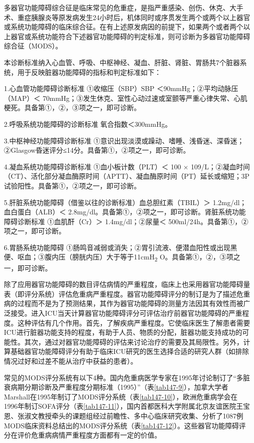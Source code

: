 多器官功能障碍综合征是临床常见的危重症，是指严重感染、创伤、休克、大手术、重症胰腺炎等原发病发生24小时后，机体同时或序贯发生两个或两个以上器官或系统功能障碍的临床综合征。在有上述原发病因的前提下，如果两个或者两个以上器官或系统功能符合下述器官功能障碍的判定标准，则可诊断为多器官功能障碍综合征（MODS）。

本诊断标准纳入心血管、呼吸、中枢神经、凝血、肝脏、肾脏、胃肠共7个脏器系统，用于反映脏器功能障碍的指标和判定标准如下：

1.心血管功能障碍诊断标准 ①收缩压（SBP）SBP
＜90mmHg；②平均动脉压（MAP）＜
70mmHg；③发生休克、室性心动过速或室颤等严重心律失常、心肌梗死。具备第①，②，③项之一，即可诊断。

2.呼吸系统功能障碍的诊断标准 氧合指数＜300mmHg。

3.中枢神经功能障碍诊断标准
①意识出现淡漠或躁动、嗜睡、浅昏迷、深昏迷；②Glasgow昏迷评分≤14分。具备第①，②项之一，即可诊断。

4.凝血系统功能障碍诊断标准 ①血小板计数（PLT）＜ 100 ×
109/L；②凝血时间（CT）、活化部分凝血酶原时间（APTT）、凝血酶原时间（PT）延长或缩短；3P试验阳性。具备第①，②项之一，即可诊断。

5.肝脏系统功能障碍（借鉴以往的诊断标准）血总胆红素（TBIL）＞
1.2mg/dl；血白蛋白（ALB）＜
2.8mg/dl。具备第①，②项之一，即可诊断。肾脏系统功能障碍诊断标准
①血肌酐（Cr）＞ 1.4mg/dl；②尿量＜
500ml/24h。具备第①，②项之一，即可诊断。

6.胃肠系统功能障碍
①肠鸣音减弱或消失；②胃引流液、便潜血阳性或出现黑便、呕血；③腹内压（膀胱内压）大于等于11cmH\textsubscript{2}
O。具备第①，②，③项之一，即可诊断。

除了应用器官功能障碍的数目评估病情的严重程度，临床上也采用器官功能障碍量表（即评分系统）评估危重病严重程度。器官功能障碍评分的制订是为了描述危重病的过程而不是为了预测结果，其作为器官功能障碍的测量方法因其有效性而被广泛接受。进入ICU当天计算器官功能障碍评分可评估治疗前器官功能障碍的严重程度。这种评估有几个作用。首先，了解疾病严重程度。它使临床医生了解患者需要ICU进行脏器功能支持的程度，有助于人员、物质的分配，脏器功能支持成功的可能性。其次，通过对器官功能障碍的评估来讨论治疗的需要及其局限性。另外，计算基础器官功能障碍评分有助于临床ICU研究的医生选择合适的研究人群（如排除情况过好和过差不能从治疗中获益的患者）。

常见的MODS评分系统有以下4种。国内危重病医学专家在1995年讨论制订了“多脏衰病期分期诊断及严重程度分期标准（1995）”（表\ref{tab147-9}），加拿大学者Marshall在1995年制订了MODS评分系统（表\ref{tab147-10}），欧洲危重病学会在1996年制订SOFA评分（表\ref{tab147-11}），国内首都医科大学附属北京友谊医院王宝恩、张淑文教授牵头的课题组经过前瞻性、多中心临床研究收集、分析了1087例MODS临床资料总结出的MODS评分系统（表\ref{tab147-12}）。这些器官功能障碍评分在评价危重病病情严重程度方面都有一定的价值。

